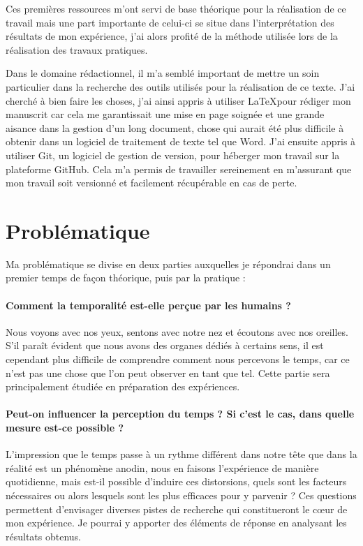 \documentclass[12pt,fleqn,oneside,french,openany]{book} %
\begin{document}
Ces premières ressources m'ont servi de base théorique pour la réalisation de ce travail mais une part importante de celui-ci se situe dans l'interprétation des résultats de mon expérience, j'ai alors profité de la méthode utilisée lors de la réalisation des travaux pratiques. 

Dans le domaine rédactionnel, il m'a semblé important de mettre un soin particulier dans la recherche des outils utilisés pour la réalisation de ce texte. J'ai cherché à bien faire les choses, j'ai ainsi appris à utiliser \LaTeX pour rédiger mon manuscrit car cela me garantissait une mise en page soignée et une grande aisance dans la gestion d'un long document, chose qui aurait été plus difficile à obtenir dans un logiciel de traitement de texte tel que Word. J'ai ensuite appris à utiliser Git, un logiciel de gestion de version, pour héberger mon travail sur la plateforme GitHub. Cela m'a permis de travailler sereinement en m'assurant que mon travail soit versionné et facilement récupérable en cas de perte.


\section{Problématique} \label{sec:problematique}
Ma problématique se divise en deux parties auxquelles je répondrai dans un premier temps de façon théorique, puis par la pratique :

\paragraph{Comment la temporalité est-elle perçue par les humains ?} Nous voyons avec nos yeux, sentons avec notre nez et écoutons avec nos oreilles. S'il paraît évident que nous avons des organes dédiés à certains sens, il est cependant plus difficile de comprendre comment nous percevons le temps, car ce n'est pas une chose que l'on peut observer en tant que tel. Cette partie sera principalement étudiée en préparation des expériences. 

\paragraph{Peut-on influencer la perception du temps ? Si c'est le cas, dans quelle mesure est-ce possible ?} L'impression que le temps passe à un rythme différent dans notre tête que dans la réalité est un phénomène anodin, nous en faisons l'expérience de manière quotidienne, mais est-il possible d'induire ces distorsions, quels sont les facteurs nécessaires ou alors lesquels sont les plus efficaces pour y parvenir ? Ces questions permettent d'envisager diverses pistes de recherche qui constitueront le cœur de mon expérience. Je pourrai y apporter des éléments de réponse en analysant les résultats obtenus. %
\end{document}

